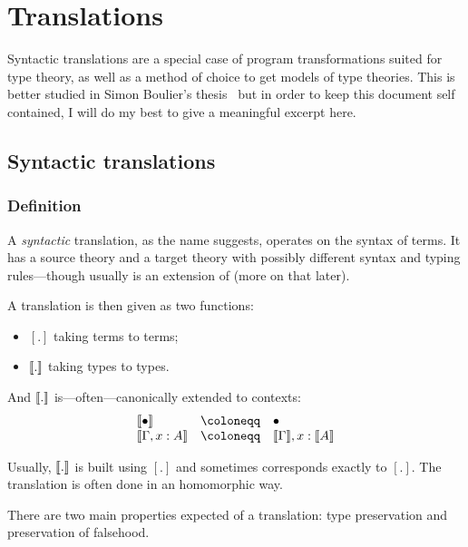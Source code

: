 \chapter{Translations}

Syntactic translations are a special case of program transformations suited
for type theory, as well as a method of choice to get models of type theories.
This is better studied in Simon Boulier's
thesis~
but in order to keep this document self contained, I will do my best to give a
meaningful excerpt here.

\section{Syntactic translations}

\subsection{Definition}

A \emph{syntactic} translation, as the name suggests, operates on the syntax
of terms. It has a source theory \cS and a target theory \cT with possibly
different syntax and typing rules---though usually \cS is an extension of \cT
(more on that later).

A translation is then given as two functions:
\begin{itemize}
  \item \([.]\) taking \cS terms to \cT terms;
  \item \(\llbracket . \rrbracket\) taking \cS types to \cT types.
\end{itemize}
And \(\llbracket . \rrbracket\) is---often---canonically extended to contexts:
\[
\begin{array}{lcl}
  \transl{\ctxempty} &\coloneqq& \ctxempty \\
  \transl{\Ga, x : A} &\coloneqq& \transl{\Ga}, x : \transl{A}
\end{array}
\]

Usually, \(\llbracket . \rrbracket\) is built using \([.]\) and sometimes corresponds
exactly to \([.]\).
The translation is often done in an homomorphic way.

There are two main properties expected of a translation: type preservation
and preservation of falsehood.

